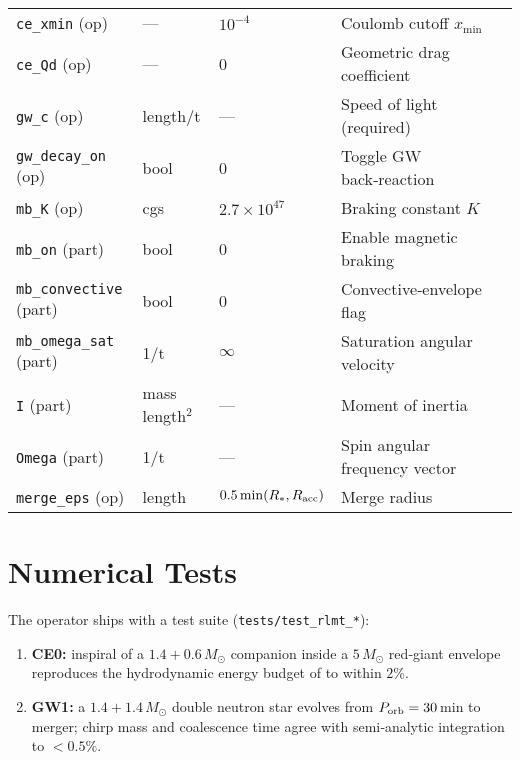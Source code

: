 \documentclass[11pt]{article}
\begin{document}
\begin{table}[h]
\begin{tabular}{@{}lllll@{}}
\texttt{ce\_xmin}           (op) & — & $10^{-4}$ & Coulomb cutoff $x_{\min}$\\
\texttt{ce\_Qd}             (op) & — & 0 & Geometric drag coefficient\\[0.2em]
%
\texttt{gw\_c}              (op) & length/t & — & Speed of light (required)\\
\texttt{gw\_decay\_on}      (op) & bool & 0 & Toggle GW back‑reaction\\[0.2em]
%
\texttt{mb\_K}             (op) & cgs & $2.7\times10^{47}$ & Braking constant $K$\\
\texttt{mb\_on}            (part) & bool & 0 & Enable magnetic braking\\
\texttt{mb\_convective}    (part) & bool & 0 & Convective‑envelope flag\\
\texttt{mb\_omega\_sat}    (part) & 1/t & $\infty$ & Saturation angular velocity\\
\texttt{I}                 (part) & mass\,length$^2$ & — & Moment of inertia\\
\texttt{Omega}             (part) & 1/t & — & Spin angular frequency vector\\[0.2em]
%
\texttt{merge\_eps}         (op) & length & $0.5\min(R_*,R_{\rm acc})$ & Merge radius\\
\bottomrule
\end{tabular}
\end{table}

\section{Numerical Tests}
\label{sec:tests}
The operator ships with a test suite (\texttt{tests/test\_rlmt\_*}):

\begin{enumerate}[nosep]
\item \textbf{CE0:} inspiral of a $1.4+0.6\,M_\odot$ companion inside a
      $5\,M_\odot$ red‑giant envelope reproduces the hydrodynamic energy
      budget of \citet{Fragos2019} to within $2\%$.
\item \textbf{GW1:} a $1.4+1.4\,M_\odot$ double neutron star evolves from
      $P_{\rm orb}=30$ min to merger; chirp mass and coalescence time agree
      with semi‑analytic integration to $<0.5\%$.
\end{enumerate}

\end{document}
